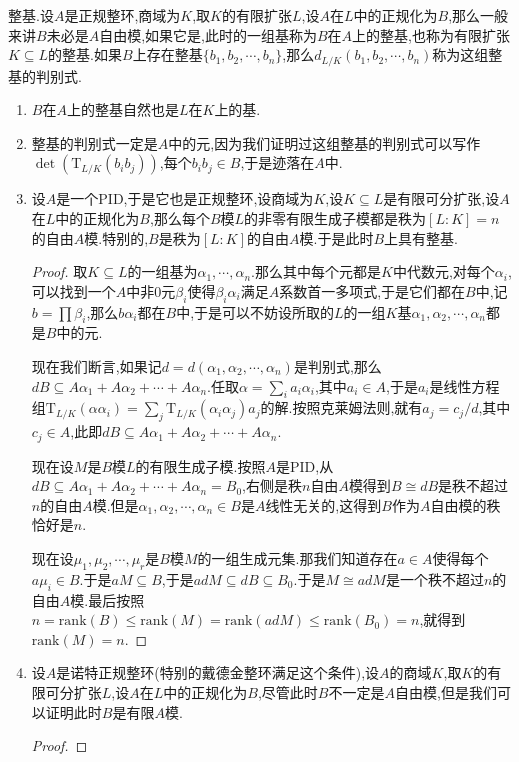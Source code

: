 整基.设$A$是正规整环,商域为$K$,取$K$的有限扩张$L$,设$A$在$L$中的正规化为$B$,那么一般来讲$B$未必是$A$自由模,如果它是,此时的一组基称为$B$在$A$上的整基,也称为有限扩张$K\subseteq L$的整基.如果$B$上存在整基$\{b_1,b_2,\cdots,b_n\}$,那么$d_{L/K}(b_1,b_2,\cdots,b_n)$称为这组整基的判别式.
\begin{enumerate}
	\item $B$在$A$上的整基自然也是$L$在$K$上的基.
	\item 整基的判别式一定是$A$中的元,因为我们证明过这组整基的判别式可以写作$\det(\mathrm{T}_{L/K}(b_ib_j))$,每个$b_ib_j\in B$,于是迹落在$A$中.
	\item 设$A$是一个PID,于是它也是正规整环,设商域为$K$,设$K\subseteq L$是有限可分扩张,设$A$在$L$中的正规化为$B$,那么每个$B$模$L$的非零有限生成子模都是秩为$[L:K]=n$的自由$A$模.特别的,$B$是秩为$[L:K]$的自由$A$模.于是此时$B$上具有整基.
	\begin{proof}
		
		取$K\subseteq L$的一组基为$\alpha_1,\cdots,\alpha_n$.那么其中每个元都是$K$中代数元,对每个$\alpha_i$,可以找到一个$A$中非0元$\beta_i$使得$\beta_i\alpha_i$满足$A$系数首一多项式,于是它们都在$B$中,记$b=\prod\beta_i$,那么$b\alpha_i$都在$B$中,于是可以不妨设所取的$L$的一组$K$基$\alpha_1,\alpha_2,\cdots,\alpha_n$都是$B$中的元.
		
		现在我们断言,如果记$d=d(\alpha_1,\alpha_2,\cdots,\alpha_n)$是判别式,那么$dB\subseteq A\alpha_1+A\alpha_2+\cdots+A\alpha_n$.任取$\alpha=\sum_ia_i\alpha_i$,其中$a_i\in A$,于是$a_i$是线性方程组$\mathrm{T}_{L/K}(\alpha\alpha_i)=\sum_j\mathrm{T}_{L/K}(\alpha_i\alpha_j)a_j$的解.按照克莱姆法则,就有$a_j=c_j/d$,其中$c_j\in A$,此即$dB\subseteq A\alpha_1+A\alpha_2+\cdots+A\alpha_n$.
		
		现在设$M$是$B$模$L$的有限生成子模.按照$A$是PID,从$dB\subseteq A\alpha_1+A\alpha_2+\cdots+A\alpha_n=B_0$,右侧是秩$n$自由$A$模得到$B\cong dB$是秩不超过$n$的自由$A$模.但是$\alpha_1,\alpha_2,\cdots,\alpha_n\in B$是$A$线性无关的,这得到$B$作为$A$自由模的秩恰好是$n$.
		
		现在设$\mu_1,\mu_2,\cdots,\mu_r$是$B$模$M$的一组生成元集.那我们知道存在$a\in A$使得每个$a\mu_i\in B$.于是$aM\subseteq B$,于是$adM\subseteq dB\subseteq B_0$.于是$M\cong adM$是一个秩不超过$n$的自由$A$模.最后按照$n=\mathrm{rank}(B)\le\mathrm{rank}(M)=\mathrm{rank}(adM)\le\mathrm{rank}(B_0)=n$,就得到$\mathrm{rank}(M)=n$.
	\end{proof}
    \item 设$A$是诺特正规整环(特别的戴德金整环满足这个条件),设$A$的商域$K$,取$K$的有限可分扩张$L$,设$A$在$L$中的正规化为$B$,尽管此时$B$不一定是$A$自由模,但是我们可以证明此时$B$是有限$A$模.
    \begin{proof}
    	

\end{proof}
\end{enumerate}
